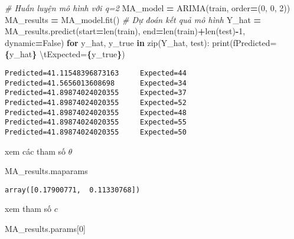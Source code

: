 \documentclass[
]{book}
\newenvironment{Shaded}{\begin{snugshade}}{\end{snugshade}}
\newcommand{\BuiltInTok}[1]{#1}
\newcommand{\CharTok}[1]{\textcolor[rgb]{0.31,0.60,0.02}{#1}}
\newcommand{\CommentTok}[1]{\textcolor[rgb]{0.56,0.35,0.01}{\textit{#1}}}
\newcommand{\ControlFlowTok}[1]{\textcolor[rgb]{0.13,0.29,0.53}{\textbf{#1}}}
\newcommand{\DecValTok}[1]{\textcolor[rgb]{0.00,0.00,0.81}{#1}}
\newcommand{\KeywordTok}[1]{\textcolor[rgb]{0.13,0.29,0.53}{\textbf{#1}}}
\newcommand{\NormalTok}[1]{#1}
\newcommand{\OperatorTok}[1]{\textcolor[rgb]{0.81,0.36,0.00}{\textbf{#1}}}
\newcommand{\SpecialCharTok}[1]{\textcolor[rgb]{0.81,0.36,0.00}{\textbf{#1}}}
\newcommand{\SpecialStringTok}[1]{\textcolor[rgb]{0.31,0.60,0.02}{#1}}
\newcommand{\VariableTok}[1]{\textcolor[rgb]{0.00,0.00,0.00}{#1}}
\begin{document}
\begin{Shaded}
\begin{Highlighting}[]
\CommentTok{\# Huấn luyện mô hình với q=2}
\NormalTok{MA\_model }\OperatorTok{=}\NormalTok{ ARIMA(train, order}\OperatorTok{=}\NormalTok{(}\DecValTok{0}\NormalTok{, }\DecValTok{0}\NormalTok{, }\DecValTok{2}\NormalTok{))}
\NormalTok{MA\_results }\OperatorTok{=}\NormalTok{ MA\_model.fit()}
\CommentTok{\# Dự đoán kết quả mô hình}
\NormalTok{Y\_hat }\OperatorTok{=}\NormalTok{ MA\_results.predict(start}\OperatorTok{=}\BuiltInTok{len}\NormalTok{(train), end}\OperatorTok{=}\BuiltInTok{len}\NormalTok{(train)}\OperatorTok{+}\BuiltInTok{len}\NormalTok{(test)}\OperatorTok{{-}}\DecValTok{1}\NormalTok{, dynamic}\OperatorTok{=}\VariableTok{False}\NormalTok{)}
\ControlFlowTok{for}\NormalTok{ y\_hat, y\_true }\KeywordTok{in} \BuiltInTok{zip}\NormalTok{(Y\_hat, test):}
    \BuiltInTok{print}\NormalTok{(}\SpecialStringTok{f\textquotesingle{}Predicted=}\SpecialCharTok{\{}\NormalTok{y\_hat}\SpecialCharTok{\}}\SpecialStringTok{ }\CharTok{\textbackslash{}t}\SpecialStringTok{Expected=}\SpecialCharTok{\{}\NormalTok{y\_true}\SpecialCharTok{\}}\SpecialStringTok{\textquotesingle{}}\NormalTok{)}
\end{Highlighting}
\end{Shaded}

\begin{verbatim}
Predicted=41.11548396873163     Expected=44
Predicted=41.5656013608698      Expected=34
Predicted=41.89874024020355     Expected=37
Predicted=41.89874024020355     Expected=52
Predicted=41.89874024020355     Expected=48
Predicted=41.89874024020355     Expected=55
Predicted=41.89874024020355     Expected=50
\end{verbatim}

xem các tham số \(\theta\)

\begin{Shaded}
\begin{Highlighting}[]
\NormalTok{MA\_results.maparams}
\end{Highlighting}
\end{Shaded}

\begin{verbatim}
array([0.17900771,  0.11330768])
\end{verbatim}

xem tham số \(c\)

\begin{Shaded}
\begin{Highlighting}[]
\NormalTok{MA\_results.params[}\DecValTok{0}\NormalTok{]}
\end{Highlighting}
\end{Shaded}
\end{document}
